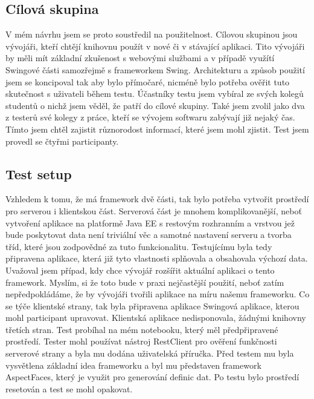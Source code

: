 \subsection{Cílová skupina}
V mém návrhu jsem se proto soustředil na použitelnost. Cílovou skupinou jsou vývojáři, kteří chtějí knihovnu použít v nové či v stávající aplikaci. Tito vývojáři by měli mít základní zkušenost s webovými službami a v případě využítí Swingové části samozřejmě s frameworkem Swing. Architekturu a způsob použití jsem se koncipoval tak aby bylo přímočaré, nicméně bylo potřeba ověřit tuto skutečnost s uživateli během testu. Účastníky testu jsem vybíral ze svých kolegů studentů o nichž jsem věděl, že patří do cílové skupiny. Také jsem zvolil jako dva z testerů své kolegy z práce, kteří se vývojem softwaru zabývají již nejaký čas. Tímto jsem chtěl zajistit různorodost informací, které jsem mohl zjistit. Test jsem provedl se čtyřmi participanty.

\subsection{Test setup}
Vzhledem k tomu, že má framework dvě části, tak bylo potřeba vytvořit prostředí pro serverou i klientskou část. Serverová část je mnohem komplikovanější, neboť vytvoření aplikace na platformě Java EE s restovým rozhranním a vrstvou jež bude poskytovat data není triviální věc a samotné nastavení serveru a tvorba tříd, které jsou zodpovědné za tuto funkcionalitu. Testujícímu byla tedy připravena aplikace, která již tyto vlastnosti splňovala a obsahovala výchozí data. Uvažoval jsem případ, kdy chce vývojář rozšířit aktuální aplikaci o tento framework. Myslím, si že toto bude v praxi nejčastější použití, neboť zatím nepředpokládáme, že by vývojáři tvořili aplikace na míru našemu frameworku. Co se týče klientské strany, tak byla připravena aplikace Swingová aplikace, kterou mohl participant upravovat. Klientská aplikace nedisponovala, žádnými knihovny třetích stran. Test probíhal na mém notebooku, který měl předpřipravené prostředí. Tester mohl používat nástroj RestClient pro ověření funkčnosti serverové strany a byla mu dodána uživatelská příručka. Před testem mu byla vysvětlena základní idea frameworku a byl mu představen framework AspectFaces, který je využit pro generování definic dat. Po testu bylo prostředí resetován a test se mohl opakovat.

